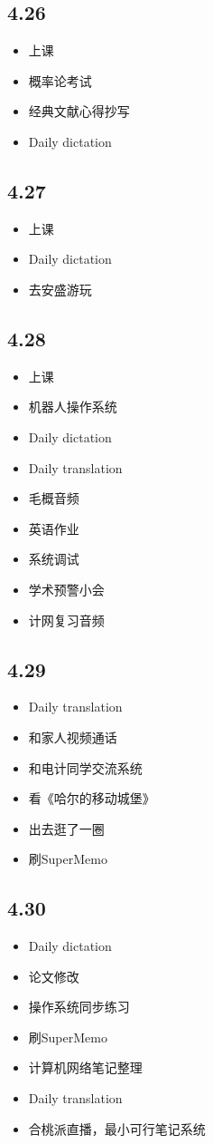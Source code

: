 \documentclass[UTF8]{ctexart}
\begin{document}
\subsection*{4.26}
\begin{itemize}
    \item 上课
    \item 概率论考试
    \item 经典文献心得抄写
    \item Daily dictation
\end{itemize}
\subsection*{4.27}
\begin{itemize}
    \item 上课
    \item Daily dictation
    \item 去安盛游玩
\end{itemize}
\subsection*{4.28}
\begin{itemize}
    \item 上课
    \item 机器人操作系统
    \item Daily dictation
    \item Daily translation
    \item 毛概音频
    \item 英语作业
    \item 系统调试
    \item 学术预警小会
    \item 计网复习音频
\end{itemize}
\subsection*{4.29}
\begin{itemize}
    \item Daily translation
    \item 和家人视频通话
    \item 和电计同学交流系统
    \item 看《哈尔的移动城堡》
    \item 出去逛了一圈
    \item 刷SuperMemo
\end{itemize}
\subsection*{4.30}
\begin{itemize}
    \item Daily dictation
    \item 论文修改
    \item 操作系统同步练习
    \item 刷SuperMemo
    \item 计算机网络笔记整理
    \item Daily translation
    \item 合桃派直播，最小可行笔记系统
\end{itemize}
\end{document}
